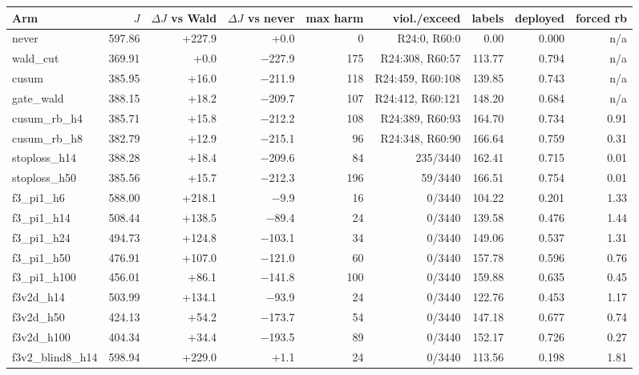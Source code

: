 \begin{tabular}{@{}l r r r r r r r r@{}}
\toprule
Arm & $J$ & $\Delta J$ vs Wald & $\Delta J$ vs never & max harm & viol./exceed & labels & deployed & forced rb \\
\midrule
never & 597.86 & +227.9 & +0.0 & 0 & R24:0, R60:0 & 0.00 & 0.000 & n/a \\
wald\_cut & 369.91 & +0.0 & $-$227.9 & 175 & R24:308, R60:57 & 113.77 & 0.794 & n/a \\
cusum & 385.95 & +16.0 & $-$211.9 & 118 & R24:459, R60:108 & 139.85 & 0.743 & n/a \\
gate\_wald & 388.15 & +18.2 & $-$209.7 & 107 & R24:412, R60:121 & 148.20 & 0.684 & n/a \\
cusum\_rb\_h4 & 385.71 & +15.8 & $-$212.2 & 108 & R24:389, R60:93 & 164.70 & 0.734 & 0.91 \\
cusum\_rb\_h8 & 382.79 & +12.9 & $-$215.1 & 96 & R24:348, R60:90 & 166.64 & 0.759 & 0.31 \\
stoploss\_h14 & 388.28 & +18.4 & $-$209.6 & 84 & 235/3440 & 162.41 & 0.715 & 0.01 \\
stoploss\_h50 & 385.56 & +15.7 & $-$212.3 & 196 & 59/3440 & 166.51 & 0.754 & 0.01 \\
f3\_pi1\_h6 & 588.00 & +218.1 & $-$9.9 & 16 & 0/3440 & 104.22 & 0.201 & 1.33 \\
f3\_pi1\_h14 & 508.44 & +138.5 & $-$89.4 & 24 & 0/3440 & 139.58 & 0.476 & 1.44 \\
f3\_pi1\_h24 & 494.73 & +124.8 & $-$103.1 & 34 & 0/3440 & 149.06 & 0.537 & 1.31 \\
f3\_pi1\_h50 & 476.91 & +107.0 & $-$121.0 & 60 & 0/3440 & 157.78 & 0.596 & 0.76 \\
f3\_pi1\_h100 & 456.01 & +86.1 & $-$141.8 & 100 & 0/3440 & 159.88 & 0.635 & 0.45 \\
f3v2d\_h14 & 503.99 & +134.1 & $-$93.9 & 24 & 0/3440 & 122.76 & 0.453 & 1.17 \\
f3v2d\_h50 & 424.13 & +54.2 & $-$173.7 & 54 & 0/3440 & 147.18 & 0.677 & 0.74 \\
f3v2d\_h100 & 404.34 & +34.4 & $-$193.5 & 89 & 0/3440 & 152.17 & 0.726 & 0.27 \\
f3v2\_blind8\_h14 & 598.94 & +229.0 & +1.1 & 24 & 0/3440 & 113.56 & 0.198 & 1.81 \\
\bottomrule
\end{tabular}
